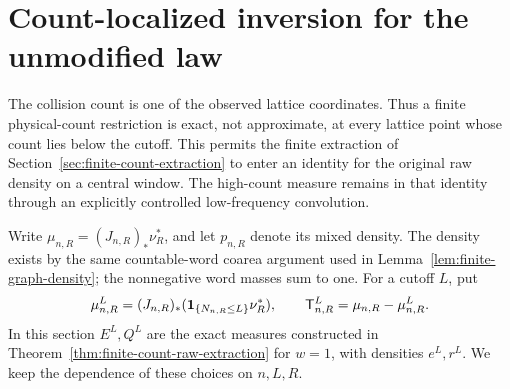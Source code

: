 \section{Count-localized inversion for the unmodified law}
\label{sec:count-localized-inversion}
The collision count is one of the observed lattice coordinates. Thus a
finite physical-count restriction is exact, not approximate, at every
lattice point whose count lies below the cutoff. This permits the
finite extraction of Section~\ref{sec:finite-count-extraction} to enter
an identity for the original raw density on a central window. The
high-count measure remains in that identity through an explicitly
controlled low-frequency convolution.

Write $\mu_{n,R}=(J_{n,R})_*\nu_R^*$, and let $p_{n,R}$ denote its
mixed density. The density exists by the same countable-word coarea
argument used in Lemma~\ref{lem:finite-graph-density}; the nonnegative
word masses sum to one. For a cutoff $L$, put
\[
 \mu^L_{n,R}=(J_{n,R})_*(\mathbf1_{\{N_{n,R}\le L\}}\nu_R^*),
 \qquad \mathsf T^L_{n,R}=\mu_{n,R}-\mu^L_{n,R}.
\]
In this section $E^L,Q^L$ are the exact measures constructed in
Theorem~\ref{thm:finite-count-raw-extraction} for $w=1$, with densities
$e^L,r^L$. We keep the dependence of these choices on $n,L,R$.

